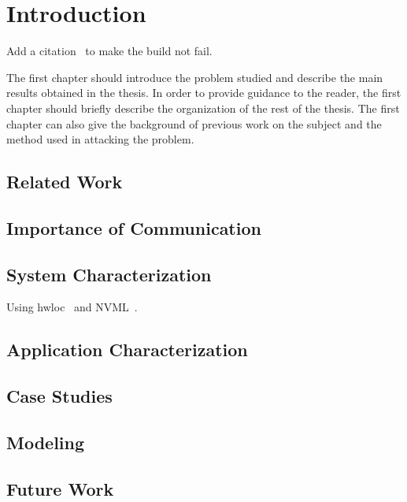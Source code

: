 
\chapter{Introduction}
Add a citation~\cite{IEEEexample:urlsty} to make the build not fail.

The first chapter should introduce the problem studied and describe the main results obtained in the thesis.
In order to provide guidance to the reader, the first chapter should briefly describe the organization of the rest of the thesis.
The first chapter can also give the background of previous work on the subject and the method used in attacking the problem.

\outline{

}

\section{Related Work}

\section{Importance of Communication}

\section{System Characterization}

Using hwloc~\cite{broquedis2010hwloc} and NVML~\cite{nvidia2017nvml}.

\section{Application Characterization}

\section{Case Studies}

\section{Modeling}

\section{Future Work}

